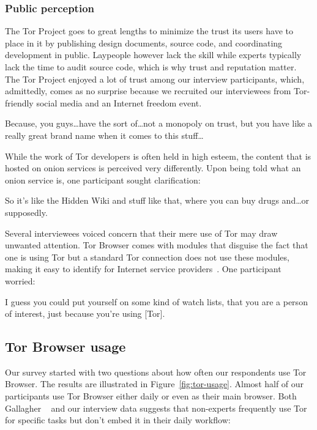 \subsubsection{Public perception}

The Tor Project goes to great lengths to minimize the trust its users have to
place in it by publishing design documents, source code, and coordinating
development in public.  Laypeople however lack the skill while experts typically
lack the time to audit source code, which is why trust and reputation matter.
The Tor Project enjoyed a lot of trust among our interview participants, which,
admittedly, comes as no surprise because we recruited our interviewees from
Tor-friendly social media and an Internet freedom event.

\begin{displayquote}[P08]
Because, you guys\dots have the sort of\dots not a monopoly on trust, but you
have like a really great brand name when it comes to this stuff\dots
\end{displayquote}

While the work of Tor developers is often held in high esteem, the content that
is hosted on onion services is perceived very differently.  Upon being told what
an onion service is, one participant sought clarification:

\begin{displayquote}[P03]
So it's like the Hidden Wiki and stuff like that, where you can buy drugs
and\dots or supposedly.
\end{displayquote}

Several interviewees voiced concern that their mere use of Tor may draw unwanted
attention.  Tor Browser comes with modules that disguise the fact that one is
using Tor but a standard Tor connection does not use these modules, making it
easy to identify for Internet service providers~\cite{pluggable}.  One
participant worried:

\begin{displayquote}[P03]
I guess you could put yourself on some kind of watch lists, that you are a
person of interest, just because you're using [Tor].
\end{displayquote}

\subsection{Tor Browser usage}

Our survey started with two questions about how often our respondents use Tor
Browser.  The results are illustrated in Figure~\ref{fig:tor-usage}.  Almost
half of our participants use Tor Browser either daily or even as their main
browser.  Both Gallagher \ea~\cite[\S~4.3.2]{Gallagher2017a} and our interview
data suggests that non-experts frequently use Tor for specific tasks but don't
embed it in their daily workflow:

